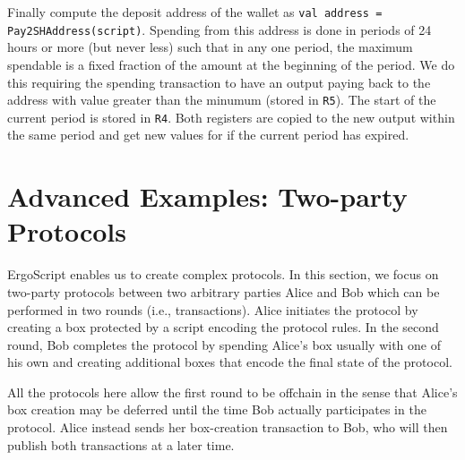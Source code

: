 \documentclass[11pt]{article}
\newcommand{\langname}{ErgoScript\xspace}
\begin{document}
Finally compute the deposit address of the wallet as \texttt{val address = Pay2SHAddress(script)}. %
Spending from this address is done in periods of 24 hours or more (but never less) such that in any one period, the maximum spendable is a fixed fraction of the amount at the beginning of the period. We do this requiring the spending transaction to have an output paying back to the address with value greater than the minumum (stored in \texttt{R5}). The start of the current period is stored in \texttt{R4}. Both registers are copied to the new output within the same period and get new values for if the current period has expired.


%
%


\section{Advanced Examples: Two-party Protocols}

\langname enables us to create complex protocols. In this section, we focus on two-party protocols between two arbitrary parties Alice and Bob which can be performed in two rounds (i.e., transactions). Alice initiates the protocol by creating a box  protected by a script encoding the protocol rules. In the second round, Bob completes the protocol by spending Alice's box usually with one of his own and creating additional boxes that encode the final state of the protocol. 

All the protocols here allow the first round to be offchain in the sense that Alice's box creation may be deferred until the time Bob actually participates in the protocol. Alice instead sends her box-creation transaction to Bob, who will then publish both transactions at a later time. 
\end{document}
